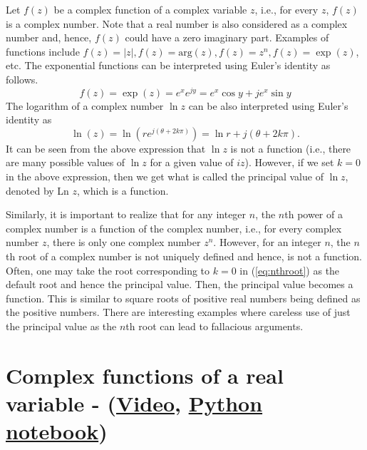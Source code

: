 Let $f(z)$ be a complex function of a complex variable $z$, i.e., for every $z$, $f(z)$ is a complex number. Note that
a real number is also considered as a complex number and, hence, $f(z)$ could have a zero imaginary part. Examples of
functions include $f(z) = |z|, f(z) = \mbox{arg}(z), f(z) = z^n, f(z) = \exp(z)$, etc.
The exponential functions can be  interpreted using Euler's identity as follows.
\[
f(z) = \exp(z) = e^xe^{jy} = e^x\cos y + je^x\sin y
\]
The logarithm of a complex number $\ln z$ can be also interpreted using Euler's identity as
\[
\ln(z) = \ln\left(r e^{j (\theta + 2 k \pi) } \right) = \ln r + j (\theta + 2 k \pi).
\]
It can be seen from the above expression that $\ln z$ is not a function (i.e., there are many possible values of $\ln z$ for a given value of $iz$). However, if we set $k=0$ in the above expression, then we get what is called the principal value of $\ln z$, denoted by Ln $z$, which is a function.

Similarly, it is important to realize that for any integer $n$, the $n$th power of a complex number is a function of the complex number, i.e., for every complex number $z$, there is only one complex number $z^n$. However, for an integer $n$, the $n$th root of a complex number is not uniquely defined and hence, is not a function. Often, one may take the root corresponding to $k=0$ in (\ref{eq:nthroot}) as the default root and hence the principal value. Then, the principal value becomes a function. This is similar to square roots of positive real numbers being defined as the positive numbers. There are interesting examples where careless use of just the principal value as the $n$th root can lead to fallacious arguments.

\section{Complex functions of a real variable - (\href{https://youtu.be/jSsg4Pxib6o}{Video},
\href{https://colab.research.google.com/drive/1WvHOa8tOM4J4GjCw-zXwvfFW08QikVXb?usp=sharing}{Python notebook})}

